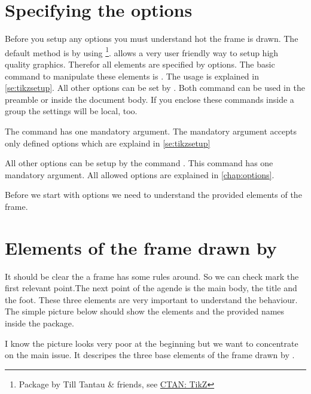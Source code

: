\documentclass[openany,12pt,tocdepth=3,showframe]{ltx-md}
\begin{document}
\section{Specifying the options}
Before you setup any options you must understand hot the frame is drawn.
The default method is by using \footnote{Package  by 
Till Tantau \& friends, see \href{http://www.ctan.org/pkg/pgf}{CTAN: TikZ}}. 
 allows a very user friendly way to setup high quality graphics. 
Therefor all elements are specified by  options. The basic command
to manipulate these elements is . The usage is explained
in \autoref{se:tikzsetup}.  All other options can be set by . 
Both command can be used in the preamble or inside the document body. If
you enclose these commands inside a group the settings will be local, too.
 
The command has one mandatory argument. The mandatory argument accepts only
defined options which are explaind in \autoref{se:tikzsetup}

All other options can be setup by the command .
This command has one mandatory argument. All allowed options are explained
in \autoref{chap:options}. 

Before we start with options we need to understand the provided elements of the frame. 

\section{Elements of the frame drawn by \texorpdfstring{}{xframed}}
It should be clear the a frame has some rules around. So we can check mark the first
relevant point.The next point of the agende is the main body, the title and the foot. These
three elements are very important to understand the behaviour. The simple picture below
should show the elements and the provided names inside the package.

\begin{center}
\label{fig:baseelements}
\end{center}
I know the picture looks very poor at the beginning but we want to concentrate on the
main issue. It descripes the three base elements of the frame drawn by .
\end{document}
